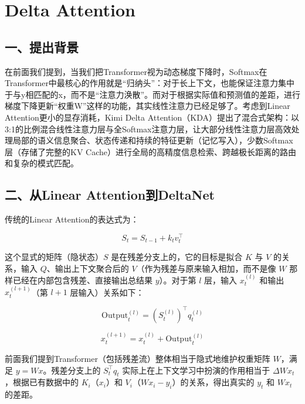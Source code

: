 \setcounter{section}{8}

\hypertarget{delta-attention}{%
\section{Delta Attention}\label{delta-attention}}

\hypertarget{ux4e00ux63d0ux51faux80ccux666f-1}{%
\subsection{一、提出背景}\label{ux4e00ux63d0ux51faux80ccux666f-1}}

在前面我们提到，当我们把Transformer视为动态梯度下降时，Softmax在Transformer中最核心的作用就是``归纳头''：对于长上下文，也能保证注意力集中于与y相匹配的x，而不是``注意力涣散''。而对于根据实际值和预测值的差距，进行梯度下降更新``权重W''这样的功能，其实线性注意力已经足够了。考虑到Linear Attention更小的显存消耗，Kimi Delta Attention（KDA）提出了混合式架构：以3:1的比例混合线性注意力层与全Softmax注意力层，让大部分线性注意力层高效处理局部的语义信息聚合、状态传递和持续的特征更新（记忆写入），少数Softmax层（存储了完整的KV Cache）进行全局的高精度信息检索、跨越极长距离的路由和复杂的模式匹配。

\hypertarget{ux4e8cux4ecelinear-attentionux5230deltanet}{%
\subsection{二、从Linear Attention到DeltaNet}\label{ux4e8cux4ecelinear-attentionux5230deltanet}}

传统的Linear Attention的表达式为：

\[
S_t=S_{t-1}+k_tv_t^\top
\]

这个显式的矩阵（隐状态）\(S\) 是在残差分支上的，它的目标是拟合 \(K\) 与 \(V\) 的关系，输入 \(Q\)、输出上下文聚合后的 \(V\)（作为残差与原来输入相加，而不是像 \(W\) 那样已经在内部包含残差、直接输出总结果 \(y\)）。对于第 \(l\) 层，输入 \(x_t^{(l)}\) 和输出 \(x_t^{(l+1)}\)（第 \(l+1\) 层输入）关系如下：

\[
\mathrm{Output}_t^{(l)}=\left(S_t^{(l)}\right)^\top q_t^{(l)}
\]

\[
x_t^{(l+1)}=x_t^{(l)}+\mathrm{Output}_t^{(l)}
\]

前面我们提到Transformer（包括残差流）整体相当于隐式地维护权重矩阵 \(W\)，满足 \(y=Wx\)。残差分支上的 \(S_t^\top q_t\) 实际上在上下文学习中扮演的作用相当于 \(\Delta W x_t\)，根据已有数据中的 \(K_i\)（\(x_i\)）和 \(V_i\)（\(Wx_i-y_i\)）的关系，得出真实的 \(y_t\) 和 \(Wx_t\) 的差距。

